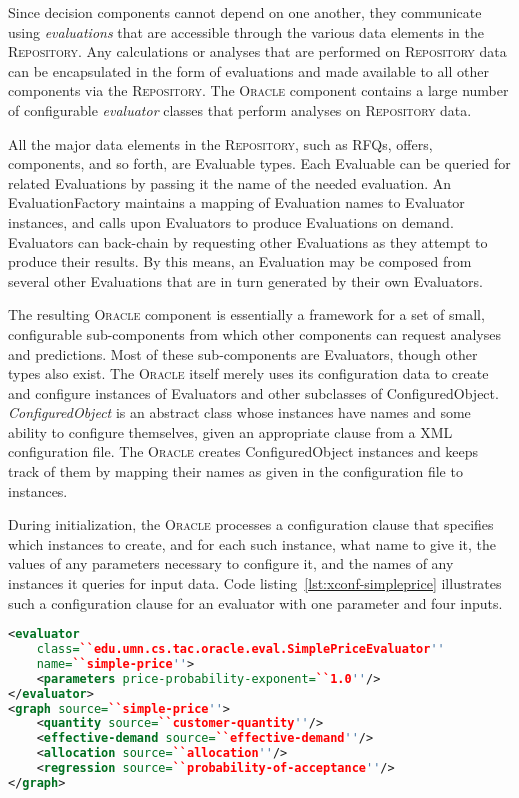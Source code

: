 \documentclass{article}
\begin{document}

Since decision components cannot depend on one another, they communicate using \emph{evaluations} that are accessible through the various data elements in the \textsc{Repository}.
Any calculations or analyses that are performed on \textsc{Repository} data can be encapsulated in the form of evaluations and made available to all other components via the \textsc{Repository}.
The \textsc{Oracle} component contains a large number of configurable \emph{evaluator} classes that perform analyses on \textsc{Repository} data.

All the major data elements in the \textsc{Repository}, such as RFQs, offers, components, and so forth, are Evaluable types.
Each Evaluable can be queried for related Evaluations by passing it the name of the needed evaluation.
An EvaluationFactory maintains a mapping of Evaluation names to Evaluator instances, and calls upon Evaluators to produce Evaluations on demand.
Evaluators can back-chain by requesting other Evaluations as they attempt to produce their results.
By this means, an Evaluation may be composed from several other Evaluations that are in turn generated by their own Evaluators.

The resulting \textsc{Oracle} component is essentially a framework for a set of small, configurable sub-components from which other components can request analyses and predictions.
Most of these sub-components are Evaluators, though other types also exist.
The \textsc{Oracle} itself merely uses its configuration data to create and configure instances of Evaluators and other subclasses of ConfiguredObject.
\emph{ConfiguredObject} is an abstract class whose instances have names and some ability to configure themselves, given an appropriate clause from a XML configuration file.
The \textsc{Oracle} creates ConfiguredObject instances and keeps track of them by mapping their names as given in the configuration file to instances.


During initialization, the \textsc{Oracle} processes a configuration clause that specifies which instances to create, and for each such instance, what name to give it, the values of any parameters necessary to configure it, and the names of any instances it queries for input data.
Code listing~\ref{lst:xconf-simpleprice} illustrates such a configuration clause for an evaluator with one parameter and four inputs.

{\small
\begin{lstlisting}[language={XML},frame={single},
label={lst:xconf-simpleprice},caption={Configuration clause for a price
evaluator that uses one parameter and several inputs}]
<evaluator
    class=``edu.umn.cs.tac.oracle.eval.SimplePriceEvaluator''
    name=``simple-price''>
    <parameters price-probability-exponent=``1.0''/>
</evaluator>
<graph source=``simple-price''>
    <quantity source=``customer-quantity''/>
    <effective-demand source=``effective-demand''/>
    <allocation source=``allocation''/>
    <regression source=``probability-of-acceptance''/>
</graph>
\end{lstlisting}
}
\end{document}
